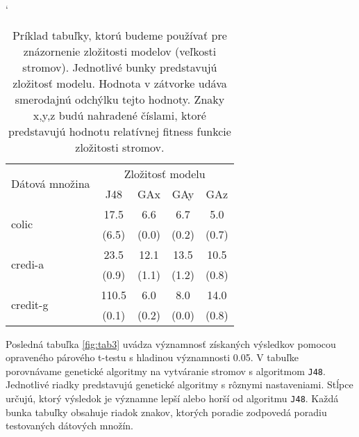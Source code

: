 \begin{table}[h]
\catcode`
\centering 
\newcommand\T{\rule{0pt}{2.6ex}}       %
\newcommand\B{\rule[-1.2ex]{0pt}{0pt}} %
\begin{tabular}{|l||c|c|c|c||}
\hline \multirow{2}{*}{Dátová množina} & \multicolumn{4}{c||}{Zložitosť modelu} \\ 
\cline{2-5} & J48 & GAx & GAy & GAz \\
\hline
\hline \multirow{2}{*}{colic} & 17.5 & 6.6 & 6.7 & 5.0 \T\\[-1.5ex]
& \tiny (6.5) & \tiny (0.0) & \tiny (0.2) & \tiny (0.7)\B\\
\hline \multirow{2}{*}{credi-a} & 23.5 & 12.1 & 13.5 & 10.5 \T\\[-1.5ex]
& \tiny (0.9) & \tiny (1.1) & \tiny (1.2) & \tiny (0.8)\B\\
\hline \multirow{2}{*}{credit-g} & 110.5 & 6.0 & 8.0 & 14.0 \T\\[-1.5ex]
& \tiny (0.1) & \tiny (0.2) & \tiny (0.0) & \tiny (0.8)\B\\
\hline
\end{tabular}
\caption{Príklad tabuľky, ktorú budeme používať pre znázornenie zložitosti modelov (veľkosti stromov). Jednotlivé bunky predstavujú zložitosť modelu. Hodnota v zátvorke udáva smerodajnú odchýlku tejto hodnoty. Znaky x,y,z budú nahradené číslami, ktoré predstavujú hodnotu relatívnej fitness funkcie zložitosti stromov.}\label{fig:tab2}
\end{table}

Posledná tabuľka \ref{fig:tab3} uvádza významnosť získaných výsledkov pomocou opraveného párového t-testu s hladinou významnosti 0.05. V tabuľke porovnávame genetické algoritmy na vytváranie stromov s algoritmom \verb|J48|. Jednotlivé riadky predstavujú genetické algoritmy s rôznymi nastaveniami. Stĺpce určujú, ktorý výsledok je významne lepší alebo horší od algoritmu \verb|J48|. Každá bunka tabuľky obsahuje riadok znakov, ktorých poradie zodpovedá poradiu testovaných dátových množín.

